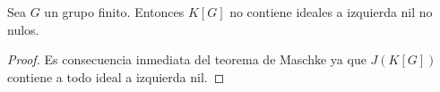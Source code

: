 \begin{corollary}
	\label{cor:GfinitoNOnil}
	Sea $G$ un grupo finito. Entonces $K[G]$ no contiene ideales a izquierda
	nil no nulos.
\end{corollary}

\begin{proof}
	Es consecuencia inmediata del teorema de Maschke ya que $J(K[G])$ contiene a
	todo ideal a izquierda nil.	
\end{proof}

%
%
%

